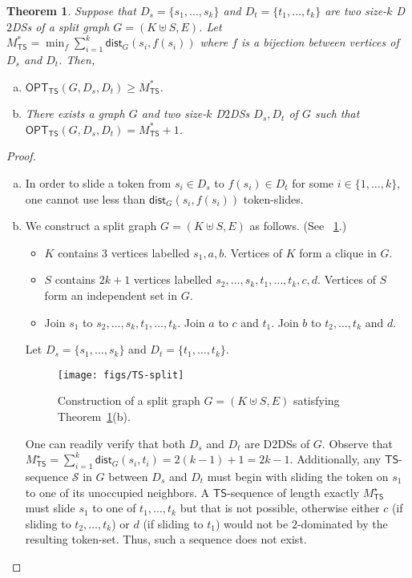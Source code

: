 \documentclass[a4paper]{article}
\theoremstyle{plain}
\newtheorem{theorem}{Theorem}
\theoremstyle{definition}
\newcommand{\sfTS}{{\mathsf{TS}}} %
\newcommand{\calS}{{\mathcal{S}}}
\newcommand{\dist}{\mathsf{dist}} %
\newcommand{\opt}{\mathsf{OPT}} %
\begin{document}
\begin{theorem}\label{thm:TS-split-shortest}
	Suppose that $D_s = \{s_1, \dots, s_k\}$ and $D_t = \{t_1, \dots, t_k\}$ are two size-$k$ D$2$DSs of a split graph $G = (K \uplus S, E)$.
	Let $M^{*}_{\sfTS} = \min_{f} \sum_{i=1}^{k} \dist_G(s_i,f(s_i))$ where $f$ is a bijection between vertices of $D_s$ and $D_t$. 
	Then,
	\begin{enumerate}[(a)]
		\item $\opt_{\sfTS}(G, D_s, D_t) \geq M^*_{\sfTS}$.
		\item There exists a graph $G$ and two size-$k$ D$2$DSs $D_s, D_t$ of $G$ such that $\displaystyle\opt_{\sfTS}(G, D_s, D_t) = M^*_{\sfTS} + 1$.
	\end{enumerate}
\end{theorem}
\begin{proof}
	\begin{enumerate}[(a)]
		\item In order to slide a token from $s_i \in D_s$ to $f(s_i) \in D_t$ for some $i \in \{1, \dots, k\}$, one cannot use less than $\dist_G(s_i, f(s_i))$ token-slides.
		\item We construct a split graph $G = (K \uplus S, E)$ as follows. 
		(See \figurename~\ref{fig:TS-split}.)
		\begin{itemize}
			\item $K$ contains $3$ vertices labelled $s_1, a, b$. Vertices of $K$ form a clique in $G$.
			\item $S$ contains $2k + 1$ vertices labelled $s_2, \dots, s_k, t_1, \dots, t_k, c, d$.
			Vertices of $S$ form an independent set in $G$.
			\item Join $s_1$ to $s_2, \dots, s_k, t_1, \dots, t_k$. Join $a$ to $c$ and $t_1$. Join $b$ to $t_2, \dots, t_k$ and $d$.
		\end{itemize}
		Let $D_s = \{s_1, \dots, s_k\}$ and $D_t = \{t_1, \dots, t_k\}$.
		\begin{figure}[ht]
			\centering
			\texttt{[image: figs/TS-split]}
			\caption{Construction of a split graph $G = (K \uplus S, E)$ satisfying Theorem~\ref{thm:TS-split-shortest}(b).}
			\label{fig:TS-split}
		\end{figure}
		
		One can readily verify that both $D_s$ and $D_t$ are D$2$DSs of $G$.
		Observe that $M^\star_{\sfTS} = \sum_{i=1}^{k}\dist_G(s_i, t_i) = 2(k-1) + 1 = 2k - 1$.
		Additionally, any $\sfTS$-sequence $\calS$ in $G$ between $D_s$ and $D_t$ must begin with sliding the token on $s_1$ to one of its unoccupied neighbors.
		A $\sfTS$-sequence of length exactly $M^\star_{\sfTS}$ must slide $s_1$ to one of $t_1, \dots, t_k$ but that is not possible, otherwise either $c$ (if sliding to $t_2, \dots, t_k$) or $d$ (if sliding to $t_1$) would not be $2$-dominated by the resulting token-set.  
		Thus, such a sequence does not exist.
		

\end{enumerate}
\end{proof}
\end{document}

